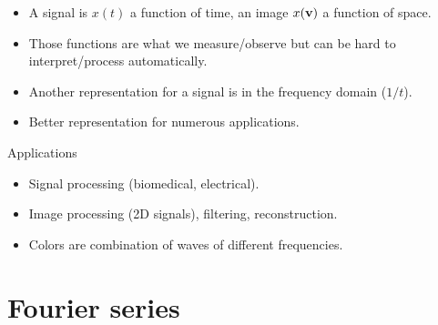 

  \begin{itemize}
    \item A signal is $x(t)$ a function of time, an image $x(\mathbf{v})$ a function of space.
    \item Those functions are what we measure/observe  but can be hard to
    interpret/process automatically.
    \item Another representation for a signal is in the frequency domain ($1/t$).
    \item Better representation for numerous applications.
  \end{itemize}


  \begin{exampleblock}{Applications}
    \begin{itemize}
      \item Signal processing (biomedical, electrical).
      \item Image processing (2D signals), filtering, reconstruction.
      \item Colors are combination of waves of different frequencies.
    \end{itemize}
  \end{exampleblock}
  
\section{Fourier series}
\label{sec:fourier-transform}


